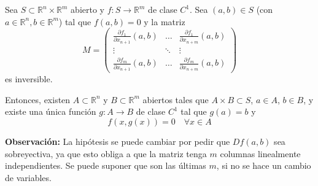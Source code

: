 \begin{theorem}
    Sea \(S \subset \mathbb{R}^n \times \mathbb{R}^m\) abierto y \(f: S \to \mathbb{R}^m\) de clase \(C^1\).
    Sea \((a,b) \in S\) (con \(a \in \mathbb{R}^n, b \in \mathbb{R}^m\)) tal que \(f(a,b) = 0\) y la matriz
    \[ M = \begin{pmatrix}
            \frac{\partial f_1}{\partial x_{n+1}}(a,b) & \dots  & \frac{\partial f_1}{\partial x_{n+m}}(a,b) \\
            \vdots                                     & \ddots & \vdots                                     \\
            \frac{\partial f_m}{\partial x_{n+1}}(a,b) & \dots  & \frac{\partial f_m}{\partial x_{n+m}}(a,b)
        \end{pmatrix} \]
    es inversible.

    Entonces, existen \(A \subset \mathbb{R}^n\) y \(B \subset \mathbb{R}^m\) abiertos tales que \(A \times B \subset S\), \(a \in A\), \(b \in B\), y existe una única función \(g: A \to B\) de clase \(C^1\) tal que \(g(a) = b\) y
    \[ f(x,g(x)) = 0 \quad \forall x \in A \]
\end{theorem}

\noindent\textbf{Observación:} La hipótesis se puede cambiar por pedir que \(Df(a,b)\) sea sobreyectiva, ya que esto obliga a que la matriz tenga \(m\) columnas linealmente independientes. Se puede suponer que son las últimas \(m\), si no se hace un cambio de variables.

